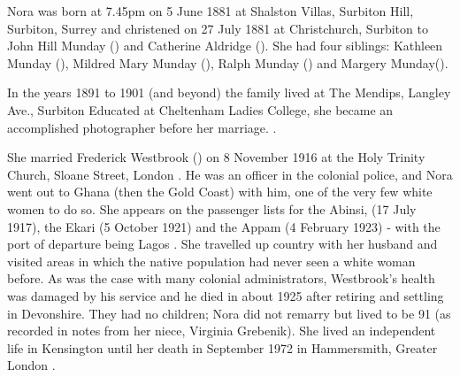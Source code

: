 
Nora was born at 7.45pm on 5 June 1881 at  Shalston Villas, Surbiton Hill,  Surbiton, Surrey and christened on 27 July 1881 at Christchurch, Surbiton \cite{NoraMundayBirth} to John Hill Munday () and Catherine Aldridge ().	She had four siblings: Kathleen Munday (), Mildred Mary Munday (), Ralph Munday () and Margery Munday().

In the years  1891 to 1901 (and beyond) the family lived at The Mendips, Langley Ave., Surbiton \cite{NoraMundayResidence}  Educated at Cheltenham Ladies College, she became an accomplished photographer before her marriage.
\cite{NoraMundayOccupation}.


She married Frederick Westbrook () on 8 November 1916 at the Holy Trinity Church, Sloane Street, London \cite{NoraMundayMarriage}.  He was an officer in the colonial police, and Nora went out to Ghana (then the Gold Coast) with him, one of the very few white women to do so. She appears on the passenger lists for the Abinsi, (17 July 1917), the Ekari (5 October 1921) and the Appam (4 February 1923) - with the port of departure being Lagos \cite{NoraMundayTravel}. She travelled up country with her husband and visited areas in which the native population had never seen a white woman before. As was the case with many colonial administrators, Westbrook's health was damaged by his service and he died in about 1925 after retiring and settling in Devonshire. They had no children; Nora did not remarry but lived to be 91 (as recorded in notes from her niece, Virginia Grebenik). She lived an independent life in Kensington until her death in September 1972 in 	Hammersmith, Greater London \cite{NoraMundayDeath}.

